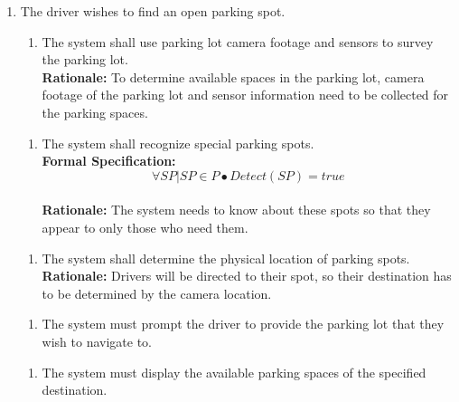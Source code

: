 \documentclass[12pt,letterpaper]{article}
\newcounter{businesseventnum}
\newcounter{funcreqnum}
\begin{document}
\begin{enumerate}[{BE}\thebusinesseventnum.] 
\item The driver wishes to find an open parking spot.
\begin{enumerate}[{FR}\thefuncreqnum.] 
    \item The system shall use parking lot camera footage and sensors to survey
    the parking lot. \label{poc1}\\
    \textbf{Rationale:} To determine available spaces in the parking lot, camera
    footage of the parking lot and sensor information need to be collected for
    the parking spaces.
\end{enumerate}
\begin{enumerate}[{FR}\thefuncreqnum.] 
    \item The system shall recognize special parking spots.\\
    \textbf{Formal Specification: } \[\forall SP | SP \in P  \bullet Detect(SP)
    = true\]\\
    \textbf{Rationale:} The system needs to know about these spots so that they
    appear to only those who need them.
\end{enumerate}
\begin{enumerate}[{FR}\thefuncreqnum.] 
    \item The system shall determine the physical location of parking spots.
    \label{poc2}\\
    \textbf{Rationale:} Drivers will be directed to their spot, so their
    destination has to be determined by the camera location.
\end{enumerate}
\begin{enumerate}[{FR}\thefuncreqnum.] 
    \item The system must prompt the driver to provide the parking lot that they
    wish to navigate to.
\end{enumerate}
\begin{enumerate}[{FR}\thefuncreqnum.] 
    \item The system must display the available parking spaces of the specified
    destination.
\end{enumerate}
\end{enumerate}
\end{document}
